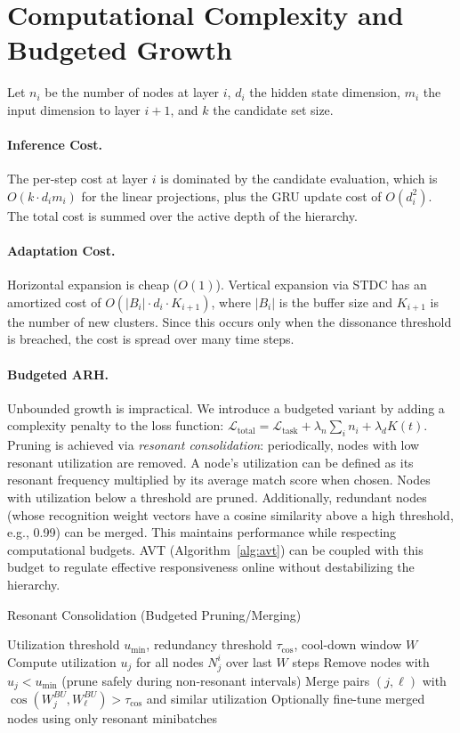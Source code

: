 \documentclass{article}
\numberwithin{figure}{section}
\numberwithin{table}{section}
\numberwithin{algorithm}{section}
\begin{document}
\section{Computational Complexity and Budgeted Growth}
Let $n_i$ be the number of nodes at layer $i$, $d_i$ the hidden state dimension, $m_i$ the input dimension to layer $i+1$, and $k$ the candidate set size.
\paragraph{Inference Cost.} The per-step cost at layer $i$ is dominated by the candidate evaluation, which is $O(k \cdot d_i m_i)$ for the linear projections, plus the GRU update cost of $O(d_i^2)$. The total cost is summed over the active depth of the hierarchy.
\paragraph{Adaptation Cost.} Horizontal expansion is cheap ($O(1)$). Vertical expansion via STDC has an amortized cost of $O(|B_i| \cdot d_i \cdot K_{i+1})$, where $|B_i|$ is the buffer size and $K_{i+1}$ is the number of new clusters. Since this occurs only when the dissonance threshold is breached, the cost is spread over many time steps.

\paragraph{Budgeted ARH.} Unbounded growth is impractical. We introduce a budgeted variant by adding a complexity penalty to the loss function: $\mathcal{L}_{\text{total}} = \mathcal{L}_{\text{task}} + \lambda_n \sum_i n_i + \lambda_d K(t)$. Pruning is achieved via \emph{resonant consolidation}: periodically, nodes with low resonant utilization are removed. A node's utilization can be defined as its resonant frequency multiplied by its average match score when chosen. Nodes with utilization below a threshold are pruned. Additionally, redundant nodes (whose recognition weight vectors have a cosine similarity above a high threshold, e.g., 0.99) can be merged. This maintains performance while respecting computational budgets. AVT (Algorithm~\ref{alg:avt}) can be coupled with this budget to regulate effective responsiveness online without destabilizing the hierarchy.

\begin{algorithm}[h]
\caption{Resonant Consolidation (Budgeted Pruning/Merging)}
\label{alg:consolidation}
\begin{algorithmic}[1]
\Require Utilization threshold $u_{\min}$, redundancy threshold $\tau_{\cos}$, cool-down window $W$
    \State Compute utilization $u_j$ for all nodes $N_j^i$ over last $W$ steps
    \State Remove nodes with $u_j < u_{\min}$ (prune safely during non-resonant intervals)
    \State Merge pairs $(j,\ell)$ with $\cos(W_j^{BU}, W_\ell^{BU}) > \tau_{\cos}$ and similar utilization
    \State Optionally fine-tune merged nodes using only resonant minibatches
\EndFor
\end{algorithmic}
\end{algorithm}
\end{document}
